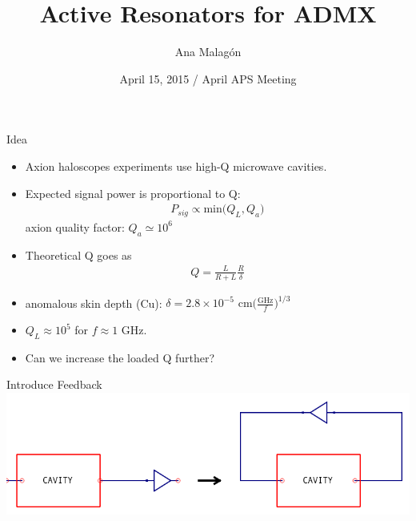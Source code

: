 \documentclass{beamer}
\title[April APS]
{Active Resonators for ADMX}
\author[Malagon]
{Ana Malag\'on}
\institute[University of Washington]
{University of Washington, ADMX Collaboration}
\date[April 12, 2015]
{April 15, 2015 / April APS Meeting}
\begin{document}
\begin{frame}
\titlepage
\end{frame}

\begin{frame}{Idea}
\begin{itemize}
\item Axion haloscopes experiments use high-Q microwave cavities.

\item Expected signal power is proportional to Q:
\begin{align*}
P_{sig} \propto \text{min}\big(Q_L, Q_a\big)
\end{align*}
axion quality factor: $Q_a \simeq 10^6$
\item Theoretical Q goes as 
\begin{align*}
Q = \frac{L}{R+L}\frac{R}{\delta}
\end{align*}

\item anomalous skin depth (Cu): $\delta = 2.8\times10^{-5}\text{ cm}\bigg(\frac{\text{GHz}}{f}\bigg)^{1/3}$

\item  $Q_L \approx 10^5$ for $f \approx 1$ GHz.


\item Can we increase the loaded Q further? 
\end{itemize}
\end{frame}

\begin{frame}{Introduce Feedback}
\centering
\includegraphics[width=\textwidth]{cavity_linear_to_nonlinear}

\end{frame}

%
\end{document}
